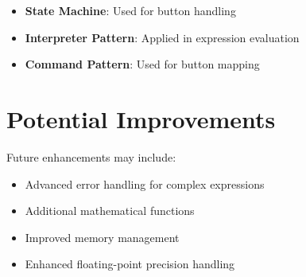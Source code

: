 \documentclass[journal]{IEEEtran}
\numberwithin{equation}{enumi}
\numberwithin{figure}{enumi}
\begin{document}
\begin{itemize}
    \item \textbf{State Machine}: Used for button handling
    \item \textbf{Interpreter Pattern}: Applied in expression evaluation
    \item \textbf{Command Pattern}: Used for button mapping
\end{itemize}

\section{Potential Improvements}

Future enhancements may include:

\begin{itemize}
    \item Advanced error handling for complex expressions
    \item Additional mathematical functions
    \item Improved memory management
    \item Enhanced floating-point precision handling
\end{itemize}
\end{document}

